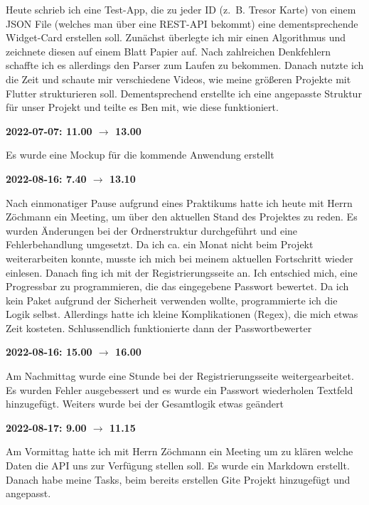 Heute schrieb ich eine Test-App, die zu jeder ID (z. B. Tresor Karte) von
einem JSON File (welches man über eine REST-API bekommt) eine
dementsprechende Widget-Card erstellen soll. Zunächst überlegte ich mir
einen Algorithmus und zeichnete diesen auf einem Blatt Papier auf. Nach
zahlreichen Denkfehlern schaffte ich es allerdings den Parser zum Laufen
zu bekommen. Danach nutzte ich die Zeit und schaute mir verschiedene
Videos, wie meine größeren Projekte mit Flutter strukturieren soll.
Dementsprechend erstellte ich eine angepasste Struktur für unser Projekt
und teilte es Ben mit, wie diese funktioniert.

\vspace{0.5cm} \textbf{2022-07-07: 11.00 $\rightarrow$ 13.00}

Es wurde eine Mockup für die kommende Anwendung erstellt

\vspace{0.5cm} \textbf{2022-08-16: 7.40 $\rightarrow$ 13.10}

Nach einmonatiger Pause aufgrund eines Praktikums hatte ich heute mit
Herrn Zöchmann ein Meeting, um über den aktuellen Stand des Projektes zu
reden. Es wurden Änderungen bei der Ordnerstruktur durchgeführt und
eine Fehlerbehandlung umgesetzt. Da ich ca. ein Monat nicht beim Projekt
weiterarbeiten konnte, musste ich mich bei meinem aktuellen Fortschritt
wieder einlesen. Danach fing ich mit der Registrierungsseite an. Ich
entschied mich, eine Progressbar zu programmieren, die das eingegebene
Passwort bewertet. Da ich kein Paket aufgrund der Sicherheit verwenden
wollte, programmierte ich die Logik selbst. Allerdings hatte ich kleine
Komplikationen (Regex), die mich etwas Zeit kosteten. Schlussendlich
funktionierte dann der Passwortbewerter

\vspace{0.5cm} \textbf{2022-08-16: 15.00 $\rightarrow$ 16.00}

Am Nachmittag wurde eine Stunde bei der Registrierungsseite
weitergearbeitet. Es wurden Fehler ausgebessert und es wurde ein
Passwort wiederholen Textfeld hinzugefügt. Weiters wurde bei der
Gesamtlogik etwas geändert

\vspace{0.5cm} \textbf{2022-08-17: 9.00 $\rightarrow$ 11.15}

Am Vormittag hatte ich mit Herrn Zöchmann ein Meeting um zu kl\"aren welche Daten
die API uns zur Verfügung stellen soll. Es wurde ein Markdown erstellt.
Danach habe meine Tasks, beim bereits erstellen Gite Projekt hinzugefügt
und angepasst.

